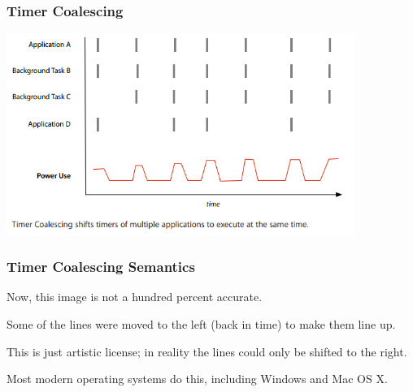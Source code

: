 \begin{frame}
\frametitle{Timer Coalescing}
\begin{center}
	\includegraphics[width=0.85\textwidth]{images/coalesced-after.png}
\end{center}

\end{frame}


\begin{frame}
\frametitle{Timer Coalescing Semantics}
\begin{changemargin}{1cm}

Now, this image is not a hundred percent accurate. 

Some of the lines were moved to the left (back in time) to make them line up. 

This is just artistic license; in reality the lines could only be shifted to the right.

Most modern operating systems do this, including Windows and Mac OS X.

\end{changemargin}
\end{frame}



